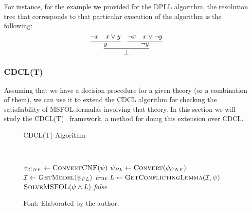 For instance, for the example we provided for the DPLL algorithm, the resolution tree that corresponds to that
particular execution of the algorithm is the following:
\[
  \infer{\bot}{\infer{y}{\neg x & x \vee y} & \infer{\neg y}{\neg x & x \vee \neg y}}
\]


\subsubsection{CDCL(T)}

Assuming that we have a decision procedure for a given theory (or a combination of them), we can use it to extend the CDCL algorithm for checking the satisfiability of MSFOL formulas involving that theory. In this section we will study the CDCL(T)~\cite{cdcl_t} framework, a method for doing this extension over CDCL.\

\begin{figure}[t]
\caption{CDCL(T) Algorithm}~\label{cdclTAlgo}
\begin{algorithmic}[1]
\State $\psi_{CNF} \gets \Call{ConvertCNF}{\psi}$
\State $\psi_{PL} \gets \Call{Convert}{\psi_{CNF}}$ 
  \State $\mathcal{I} \gets \Call{GetModel}{\psi_{PL}}$
   
    \State \Return \textit{true}
  \EndIf
  \State $L \gets \Call{GetConflictingLemma}{\mathcal{I}, \psi}$
  \State \Return $\Call{SolveMSFOL}{\psi \wedge L}$
\EndIf
\State \Return \textit{false}
\EndFunction
\end{algorithmic}
\caption*{Font: Elaborated by the author.}
\end{figure}
    

